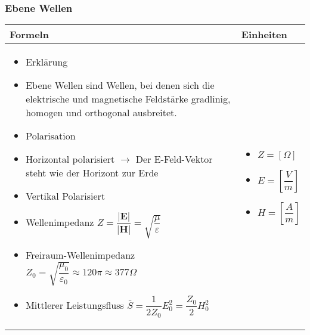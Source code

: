 \subsubsection{Ebene Wellen}
\begin{tabular}{ | m{15cm} | m{3cm}  | }
	\hline
	Formeln & Einheiten  \\ \hline
	\hline
	\begin{itemize}
		\item Erklärung
		\item[] Ebene Wellen sind Wellen, bei denen sich die elektrische und magnetische Feldstärke gradlinig, homogen und orthogonal ausbreitet. 
		\item Polarisation
		\item[] Horizontal polarisiert $\rightarrow$ Der E-Feld-Vektor steht wie der Horizont zur Erde
		\item[] Vertikal Polarisiert 
		\item Wellenimpedanz $Z=\dfrac{\big|\mathbf{E}\big|}{\big|\mathbf{H}\big|}=\sqrt{\dfrac{\mu}{\varepsilon}}$ 
		\item Freiraum-Wellenimpedanz $Z_0=\sqrt{\dfrac{\mu_0}{\varepsilon_0}}\approx120\pi \approx 377\Omega$
		\item Mittlerer Leistungsfluss $\bar{S}=\dfrac{1}{2Z_0}E_0^2=\dfrac{Z_0}{2}H_0^2$ 
	\end{itemize}   
	&
	\begin{itemize}
		\item[] $Z=[\Omega]$
		\item[] $E=[\dfrac{V}{m}]$
		\item[] $H=[\dfrac{A}{m}]$
	\end{itemize} 	
	\\ \hline
\end{tabular}